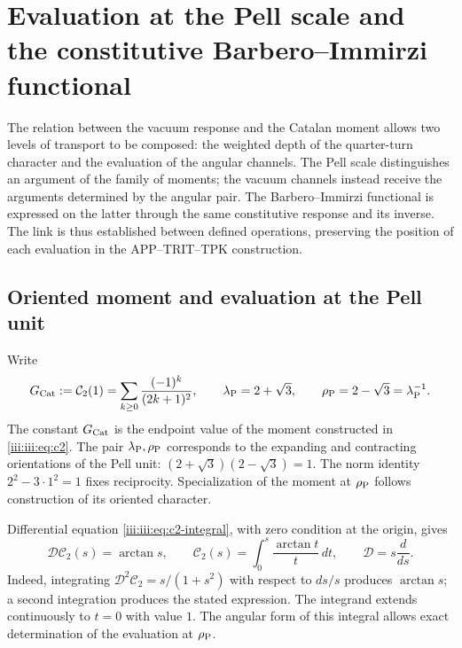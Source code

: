 \section{Evaluation at the Pell scale and the constitutive Barbero--Immirzi functional}
\label{iii:iii:sec:pell-barbero}

The relation between the vacuum response and the Catalan moment allows
two levels of transport to be composed: the weighted depth of the quarter-turn
character and the evaluation of the angular channels. The Pell
scale distinguishes an argument of the family of moments; the vacuum
channels instead receive the arguments determined by the angular pair.
The Barbero--Immirzi functional is expressed on the latter through
the same constitutive response and its inverse. The link is thus established
between defined operations, preserving the position of each evaluation
in the APP--TRIT--TPK construction.

\subsection{Oriented moment and evaluation at the Pell unit}

Write
\begin{equation}
 G_{\rm Cat}:=\mathcal C_2(1)
 =\sum_{k\geq0}\frac{(-1)^k}{(2k+1)^2},\qquad
 \lambda_{\rm P}=2+\sqrt3,\qquad
 \rho_{\rm P}=2-\sqrt3=\lambda_{\rm P}^{-1}.
 \label{iii:iii:eq:pell-scales}
\end{equation}
The constant $G_{\rm Cat}$ is the endpoint value of the moment constructed in
\eqref{iii:iii:eq:c2}. The pair $\lambda_{\rm P},\rho_{\rm P}$ corresponds to
the expanding and contracting orientations of the Pell unit:
$(2+\sqrt3)(2-\sqrt3)=1$. The norm identity $2^2-3\cdot1^2=1$
fixes reciprocity. Specialization of the moment at $\rho_{\rm P}$
follows construction of its oriented character.

Differential equation \eqref{iii:iii:eq:c2-integral}, with zero condition
at the origin, gives
\begin{equation}
 \mathcal D\mathcal C_2(s)=\arctan s,\qquad
 \mathcal C_2(s)=\int_0^s\frac{\arctan t}{t}\,dt,
 \qquad \mathcal D=s\frac{d}{ds}.
 \label{iii:iii:eq:pell-moment-integral}
\end{equation}
Indeed, integrating $\mathcal D^2\mathcal C_2=s/(1+s^2)$ with respect to
$ds/s$ produces $\arctan s$; a second integration produces the stated
expression. The integrand extends continuously to $t=0$ with value $1$.
The angular form of this integral allows exact determination of the
evaluation at $\rho_{\rm P}$.

